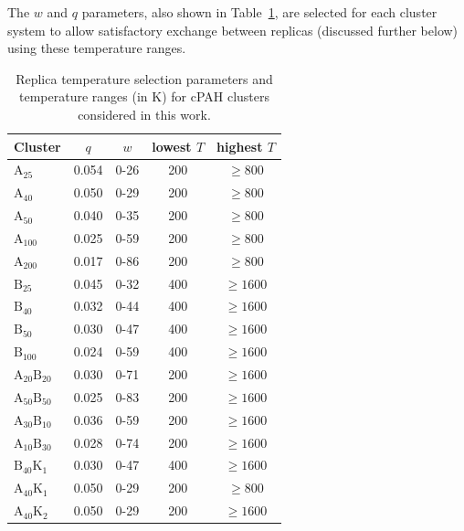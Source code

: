 The $w$ and $q$ parameters, also shown in Table~\ref{tableSI:REMDparams}, are selected for each cluster system to allow satisfactory exchange between replicas (discussed further below) using these temperature ranges.
\begin{table}[ht]
\centering
\caption{Replica temperature selection parameters and temperature ranges (in K) %
for cPAH clusters considered in this work.}
\label{tableSI:REMDparams}
\begin{tabular}{lcccc}%
\hline
Cluster & $q$ & $w$ & lowest $T$ & highest $T$ \\ \hline %
$\text{A}_{\text{25}}$ & 0.054 & 0-26 & 200 & $\ge 800$\\ %
$\text{A}_{\text{40}}$ & 0.050 & 0-29 & 200 & $\ge 800$\\ %
$\text{A}_{\text{50}}$ & 0.040 & 0-35 & 200 & $\ge 800$\\ %
$\text{A}_{\text{100}}$ & 0.025 & 0-59 & 200 & $\ge 800$\\ %
$\text{A}_{\text{200}}$ & 0.017 & 0-86 & 200 & $\ge 800$\\ \hline %
$\text{B}_{\text{25}}$ & 0.045 & 0-32 & 400 & $\ge 1600$\\ %
$\text{B}_{\text{40}}$ & 0.032 & 0-44 & 400 & $\ge 1600$\\ %
$\text{B}_{\text{50}}$ & 0.030 & 0-47 & 400 & $\ge 1600$\\ %
$\text{B}_{\text{100}}$ & 0.024 & 0-59 & 400 & $\ge 1600$\\ \hline %
$\text{A}_{\text{20}}\text{B}_{\text{20}}$ & 0.030 & 0-71 & 200 & $\ge 1600$\\ %
$\text{A}_{\text{50}}\text{B}_{\text{50}}$ & 0.025 & 0-83 & 200 & $\ge 1600$\\ %
$\text{A}_{\text{30}}\text{B}_{\text{10}}$ & 0.036 & 0-59 & 200 & $\ge 1600$\\ %
$\text{A}_{\text{10}}\text{B}_{\text{30}}$ & 0.028 & 0-74 & 200 & $\ge 1600$\\ \hline %
$\text{B}_{\text{40}}\text{K}_{\text{1}}$ & 0.030 & 0-47 & 400 & $\ge 1600$\\ %
$\text{A}_{\text{40}}\text{K}_{\text{1}}$ & 0.050 & 0-29 & 200 & $\ge 800$\\ %
$\text{A}_{\text{40}}\text{K}_{\text{2}}$ & 0.050 & 0-29 & 200 & $\ge 1600$\\ \hline %
\end{tabular}
\end{table}
%

